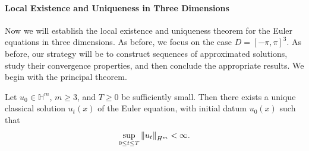 \documentclass{article}
\begin{document}
\paragraph{Local Existence and Uniqueness in Three Dimensions}
Now we will establish the local existence and uniqueness theorem for the Euler equations in three dimensions. As before, we focus on the case $D = [-\pi,\pi]^{3}$. As before, our strategy will be to construct sequences of approximated solutions, study their convergence properties, and then conclude the appropriate results. We begin with the principal theorem. 

\begin{theorem}
	Let $u_{0} \in \mathbb{H}^{m}$, $m \geq 3$, and $T \geq 0$ be sufficiently small. Then there exists a unique classical solution $u_{t}(x)$ of the Euler equation, with initial datum $u_{0}(x)$ such that 
	\begin{equation*}
		\sup_{0 \leq t \leq T}\left\Vert u_{t} \right\Vert_{H^{m}} < \infty. 
	\end{equation*}
\end{theorem} 
\end{document}

